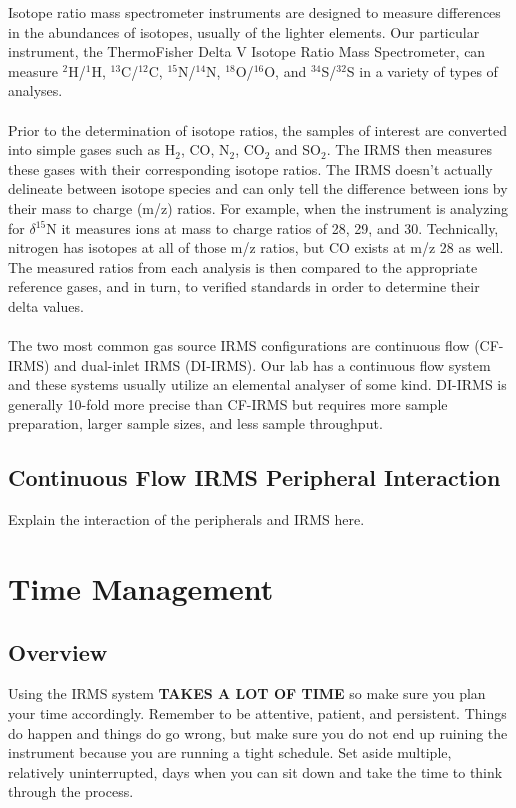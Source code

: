 \documentclass[12pt]{../SOP3}\usepackage[]{graphicx}\usepackage[]{color}
\begin{document}
\NP Isotope ratio mass spectrometer instruments are designed to measure differences in the abundances of isotopes, usually of the lighter elements. Our particular instrument, the ThermoFisher Delta V Isotope Ratio Mass Spectrometer, can measure $^{2}$H/$^{1}$H, $^{13}$C/$^{12}$C, $^{15}$N/$^{14}$N, $^{18}$O/$^{16}$O, and $^{34}$S/$^{32}$S in a variety of types of analyses.
\\
\\
Prior to the determination of isotope ratios, the samples of interest are converted into simple gases such as H$_2$, CO, N$_2$, CO$_2$ and SO$_2$. The IRMS then measures these gases with their corresponding isotope ratios. The IRMS doesn't actually delineate between isotope species and can only tell the difference between ions by their mass to charge (m/z) ratios. For example, when the instrument is analyzing for $\delta$$^{15}$N it measures ions at mass to charge ratios of 28, 29, and 30. Technically, nitrogen has isotopes at all of  those m/z ratios, but CO exists at m/z 28 as well. The measured ratios from each analysis is then compared to the appropriate reference gases, and in turn, to verified standards in order to determine their delta values.\\
\\
The two most common gas source IRMS configurations are continuous flow (CF-IRMS) and dual-inlet IRMS (DI-IRMS). Our lab has a continuous flow system and these systems usually utilize an elemental analyser of some kind. DI-IRMS is generally 10-fold more precise than CF-IRMS but requires more sample preparation, larger sample sizes, and less sample throughput.

\subsection{Continuous Flow IRMS Peripheral Interaction}

\NP Explain the interaction of the peripherals and IRMS here.

\section{Time Management}

\subsection{Overview}

\NP Using the IRMS system \textbf{TAKES A LOT OF TIME} so make sure you plan your time accordingly. Remember to be attentive, patient, and persistent. Things do happen and things do go wrong, but make sure you do not end up ruining the instrument because you are running a tight schedule. Set aside multiple, relatively uninterrupted, days when you can sit down and take the time to think through the process.
\end{document}

